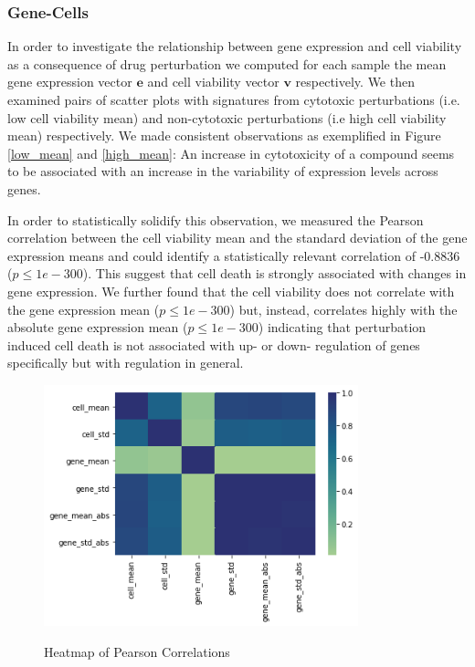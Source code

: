 \documentclass[bsc,frontabs,twoside,singlespacing,parskip,deptreport]{infthesis}     %
\let\Oldsubsubsection\subsubsection
\renewcommand{\subsubsection}{\FloatBarrier\Oldsubsubsection}
\begin{document}
\subsubsection{Gene-Cells}
In order to investigate the relationship between gene expression and cell viability as a consequence of drug perturbation we computed for each sample the mean gene expression vector \(\mathbf{e}\) and cell viability vector \(\mathbf{v}\) respectively. We then examined pairs of scatter plots with signatures from cytotoxic perturbations (i.e. low cell viability mean) and non-cytotoxic perturbations (i.e high cell viability mean) respectively. We made consistent observations as exemplified in Figure \ref{low_mean} and \ref{high_mean}: An increase in cytotoxicity of a compound  seems to be associated with an increase in the variability of expression levels across genes.

In order to statistically solidify this observation, we  measured the Pearson correlation between the cell viability mean and the standard deviation of the gene expression means and could identify a statistically relevant correlation of -0.8836 (\(p\leq1e-300\)). This suggest that cell death is strongly associated with changes in gene expression.
We further found that the cell viability does not correlate with the gene expression mean (\(p\leq1e-300\)) but, instead, correlates highly with the absolute gene expression mean (\(p\leq1e-300\)) indicating that perturbation induced cell death is not associated with up- or down- regulation of genes specifically but with regulation in general. 

\begin{figure}[h!]
\centering
\caption{Heatmap of Pearson Correlations}
\includegraphics[height=7cm]{images/gene_cell_corr.png}\label{corr_map}
\end{figure}
\end{document}
